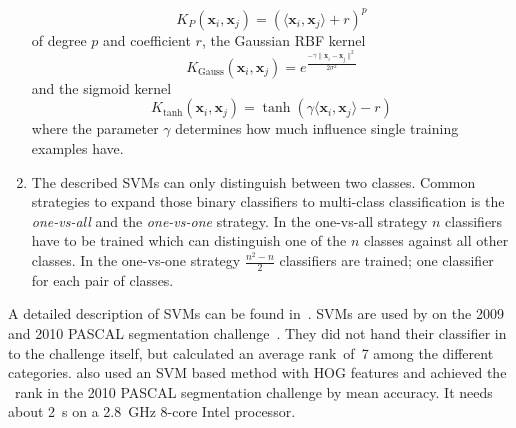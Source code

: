 \documentclass[technote,a4paper,leqno]{IEEEtran}
\begin{document}
\begin{enumerate}
          \[K_P(\mathbf{x}_i, \mathbf{x}_j) = (\langle \mathbf{x}_i, \mathbf{x}_j \rangle + r)^p\]
          of degree $p$ and coefficient $r$, the Gaussian \gls{RBF} kernel
          \[K_{\text{Gauss}}(\mathbf{x}_i, \mathbf{x}_j) = e^{\frac{-\gamma\|\mathbf{x}_i - \mathbf{x}_j\|^2}{2 \sigma^2}}\]
          and the sigmoid kernel
          \[K_{\text{tanh}}(\mathbf{x}_i, \mathbf{x}_j) = \tanh(\gamma \langle \mathbf{x}_i, \mathbf{x}_j \rangle - r)\]
          where the parameter $\gamma$ determines how much influence single
          training examples have.
    \item The described \glspl{SVM} can only distinguish between two classes.
          Common strategies to expand those binary classifiers to multi-class
          classification is the \textit{one-vs-all} and the \textit{one-vs-one}
          strategy. In the one-vs-all strategy $n$ classifiers have to be
          trained which can distinguish one of the $n$ classes against all
          other classes. In the one-vs-one strategy $\frac{n^2 - n}{2}$
          classifiers are trained; one classifier for each pair of classes.
\end{enumerate}
A detailed description of \glspl{SVM} can be found in~\cite{burges1998tutorial}.
\Glspl{SVM} are used by \cite{yang2012layered} on the 2009 and 2010 PASCAL
segmentation challenge~\cite{everingham2010pascal}. They did not hand their
classifier in to the challenge itself, but calculated an average rank~of~7
among the different categories.
\cite{felzenszwalb2010object} also used an \gls{SVM} based method with \gls{HOG}
features and achieved the ~rank in the 2010 PASCAL segmentation
challenge by mean accuracy. It needs about \SI{2}{\second} on a
\SI{2.8}{\giga\hertz} 8-core Intel processor.
\end{document}
